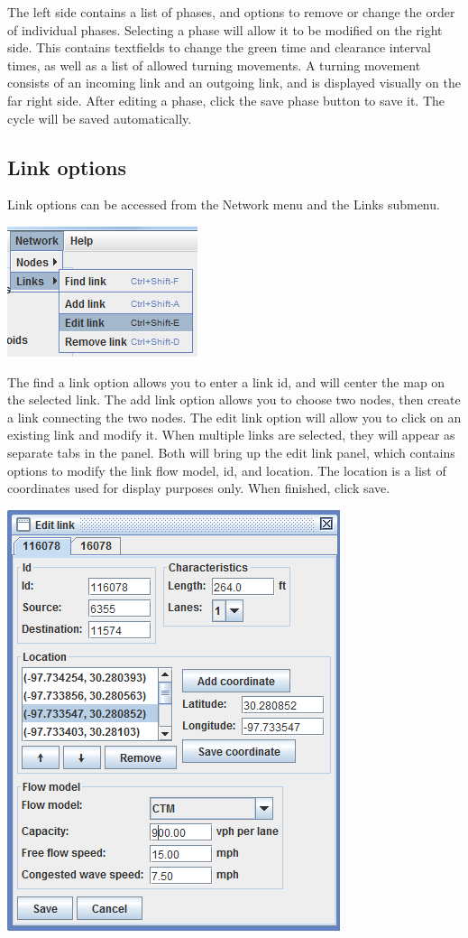 The left side contains a list of phases, and options to remove or change the order of individual phases. Selecting a phase will allow it to be modified on the right side. This contains textfields to change the green time and clearance interval times, as well as a list of allowed turning movements. A turning movement consists of an incoming link and an outgoing link, and is displayed visually on the far right side. After editing a phase, click the save phase button to save it. The cycle will be saved automatically.

\subsection{Link options}

Link options can be accessed from the Network menu and the Links submenu.
\begin{center}
\includegraphics[scale=1]{images/editor8.png}
\end{center}

The find a link option allows you to enter a link id, and will center the map on the selected link. The add link option allows you to choose two nodes, then create a link connecting the two nodes. The edit link option will allow you to click on an existing link and modify it. When multiple links are selected, they will appear as separate tabs in the panel. 
Both will bring up the edit link panel, which contains options to modify the link flow model, id, and location. The location is a list of coordinates used for display purposes only. When finished, click save.
\begin{center}
\includegraphics[scale=1]{images/editor8b.png}
\end{center}
